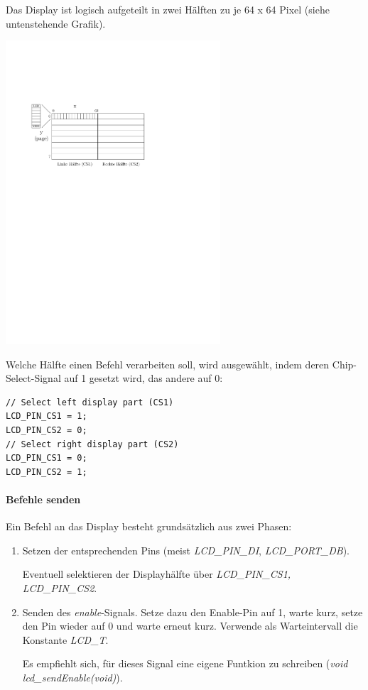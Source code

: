 Das Display ist logisch aufgeteilt in zwei Hälften zu je 64 x 64 Pixel (siehe untenstehende Grafik).
\begin{center}
	\includegraphics[width=0.6\textwidth]{display_aufbau}
\end{center}

Welche Hälfte einen Befehl verarbeiten soll, wird ausgewählt, indem deren Chip-Select-Signal auf 1 gesetzt wird, das andere auf 0:
\begin{lstlisting}
// Select left display part (CS1)
LCD_PIN_CS1 = 1;
LCD_PIN_CS2 = 0;
// Select right display part (CS2)
LCD_PIN_CS1 = 0;
LCD_PIN_CS2 = 1;
\end{lstlisting}


\paragraph*{Befehle senden}
Ein Befehl an das Display besteht grundsätzlich aus zwei Phasen:
\begin{enumerate}[1.)]
\item
Setzen der entsprechenden Pins (meist \emph{LCD\_PIN\_DI}, \emph{LCD\_PORT\_DB}).

Eventuell selektieren der Displayhälfte über \emph{LCD\_PIN\_CS1, LCD\_PIN\_CS2}.

\item
Senden des \emph{enable}-Signals.
Setze dazu den Enable-Pin auf 1, warte kurz, setze den Pin wieder auf 0 und warte erneut kurz.
Verwende als Warteintervall die Konstante \emph{LCD\_T}.

Es empfiehlt sich, für dieses Signal eine eigene Funtkion zu schreiben (\textit{void lcd\_sendEnable(void)}).
\end{enumerate}

